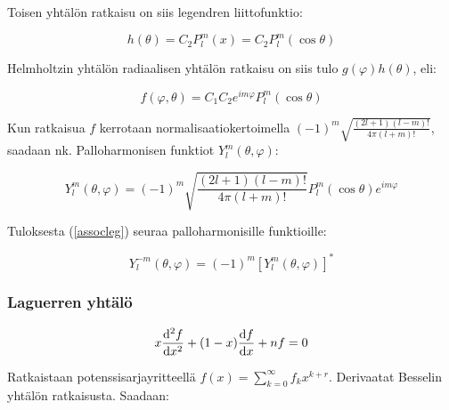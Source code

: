 \documentclass[../johdoksia.tex]{subfiles}
\begin{document}
	Toisen yhtälön ratkaisu on siis legendren liittofunktio:
	
	\begin{equation}
		\boxed{h(\theta) = C_2P_l^m(x) = C_2P_l^m(\cos\theta)}
	\end{equation}

	Helmholtzin yhtälön radiaalisen yhtälön ratkaisu on siis tulo $g(\varphi)h(\theta)$, eli:
	
	\begin{equation*}
		f(\varphi, \theta) = C_1C_2e^{im\varphi}P_l^m(\cos\theta)
	\end{equation*}

	Kun ratkaisua $f$ kerrotaan normalisaatiokertoimella $(-1)^m\sqrt{\frac{(2l + 1)(l - m)!}{4\pi(l + m)!}}$, saadaan nk. Palloharmonisen funktiot $Y_l^m(\theta, \varphi)$:
	
	\begin{equation}
		\boxed{Y_l^m(\theta, \varphi) = (-1)^m\sqrt{\frac{(2l + 1)(l - m)!}{4\pi(l + m)!}}P_l^m(\cos\theta)e^{im\varphi}}
	\end{equation}
	
	Tuloksesta (\ref{assocleg}) seuraa palloharmonisille funktioille:
	
	\begin{equation}
		\boxed{Y_l^{-m}(\theta, \varphi) = (-1)^m[Y_l^m(\theta, \varphi)]^{*}}
	\end{equation}
	
	\subsubsection{Laguerren yhtälö}
	
	\begin{equation}
		x\odv{^2f}{x^2} + (1 - x)\odv{f}{x} + n f = 0
	\end{equation}

	Ratkaistaan potenssisarjayritteellä $f(x) = \sum_{k = 0}^{\infty}f_kx^{k + r}$. Derivaatat Besselin yhtälön ratkaisusta. Saadaan:
	
\end{document}
